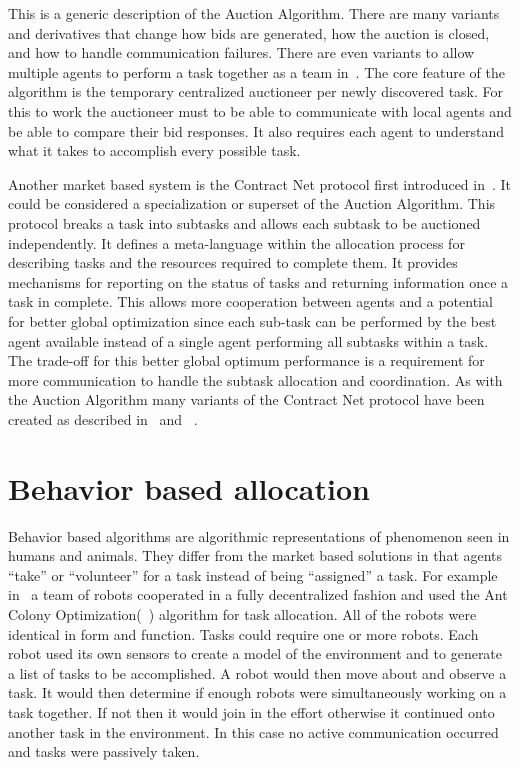 This is a generic description of the Auction Algorithm.  There are many variants and derivatives that change how bids are generated, how the auction is closed, and how to handle communication failures.  There are even variants to allow multiple agents to perform a task together as a team in~\cite{auction_team}.  The core feature of the algorithm is the temporary centralized auctioneer per newly discovered task.  For this to work the auctioneer must to be able to communicate with local agents and be able to compare their bid responses.  It also requires each agent to understand what it takes to accomplish every possible task.

Another market based system is the Contract Net protocol first introduced in~\cite{contract_net}.  It could be considered a specialization or superset of the Auction Algorithm.  This protocol breaks a task into subtasks and allows each subtask to be auctioned independently. It defines a meta-language within the allocation process for describing tasks and the resources required to complete them.  It provides mechanisms for reporting on the status of tasks and returning information once a task in complete.  This allows more cooperation between agents and a potential for better global optimization since each sub-task can be performed by the best agent available instead of a single agent performing all subtasks within a task.  The trade-off for this better global optimum performance is a requirement for more communication to handle the subtask allocation and coordination.  As with the Auction Algorithm many variants of the Contract Net protocol have been created as described in~\cite{contract_survey} and ~\cite{contract_equity}.

\section{Behavior based allocation}

Behavior based algorithms are algorithmic representations of phenomenon seen in humans and animals. They differ from the market based solutions in that agents ``take'' or ``volunteer'' for a task instead of being ``assigned'' a task.  For example in~\cite{ant_colony_opt} a team of robots cooperated in a fully decentralized fashion and used the Ant Colony Optimization(~\cite{wiki:aco}) algorithm for task allocation.  All of the robots were identical in form and function.  Tasks could require one or more robots.  Each robot used its own sensors to create a model of the environment and to generate a list of tasks to be accomplished.  A robot would then move about and observe a task.  It would then determine if enough robots were simultaneously working on a task together.  If not then it would join in the effort otherwise it continued onto another task in the environment.  In this case no active communication occurred and tasks were passively taken.


